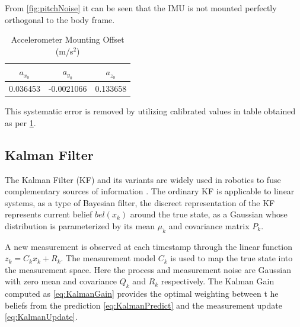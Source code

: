         From \ref{fig:pitchNoise} it can be seen that the IMU is not mounted perfectly orthogonal to the body frame. 
        \begin{table}[H]
            \centering
            \begin{tabular}{c c c} 
                \toprule
                $a_{x_0}$ & $a_{y_0}$ & $a_{z_0}$ \\
                \midrule
                0.036453 & -0.0021066 & 0.133658 \\
                \bottomrule

            \end{tabular}
            \caption{Accelerometer Mounting Offset (m/s$^{2}$)}
            \label{tab:accelOffset}
        \end{table}
        This systematic error is removed by utilizing calibrated values in table obtained as per \ref{tab:accelOffset}.
        
        
        \pagebreak{}
        \subsection{Kalman Filter}
        The Kalman Filter (KF) and its variants  are widely used in robotics to fuse 
        complementary sources of information \cite{Thrun2005ProbabilisticRobotics} \cite{perez2023quadcopter} \cite{Moore2014AGE}.
        The ordinary KF is applicable to linear systems, as a type of Bayesian filter, 
        the discreet representation of the KF represents current belief $bel(x_k)$ around the true state,
        as a Gaussian whose distribution is parameterized by its mean $\mu_k$ and covariance matrix $P_k$.

        A new measurement is observed at each timestamp through the linear function $z_k = C_k x_k + R_k$. 
        The measurement model $C_k$ is used to map the true state into the measurement space.
        Here the process and measurement noise are Gaussian with zero mean and covariance $Q_k$ and $R_k$ respectively. 
        The Kalman Gain computed as \ref{eq:KalmanGain} provides the optimal weighting between t
        he beliefs from the prediction \ref{eq:KalmanPredict} and the measurement update \ref{eq:KalmanUpdate}.



